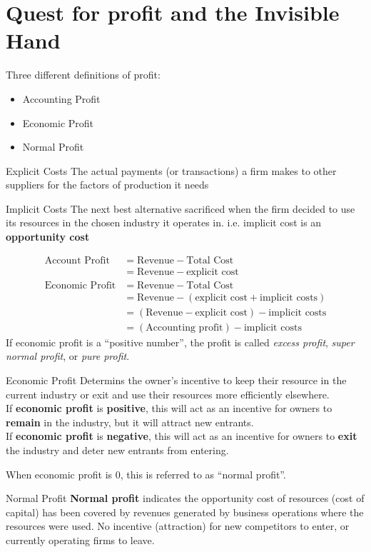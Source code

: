 \section{Quest for profit and the Invisible Hand}
Three different definitions of profit:
\begin{itemize}
	\item Accounting Profit
	\item Economic Profit
	\item Normal Profit
\end{itemize}
\begin{note}{Explicit Costs}
	The actual payments (or transactions) a firm makes to other suppliers for the factors of production it needs
\end{note}
\begin{note}{Implicit Costs}
	The next best alternative sacrificed when the firm decided to use its resources in the chosen industry it operates in. i.e. implicit cost is an \textbf{opportunity cost}
\end{note}
\begin{align*}
	\text{Account Profit} &= \text{Revenue} - \text{Total Cost}\\
	&= \text{Revenue} - \text{explicit cost}\\
	\text{Economic Profit} &= \text{Revenue} - \text{Total Cost}\\
	&= \text{Revenue} - (\text{explicit cost} + \text{implicit costs})\\
	&= (\text{Revenue} - \text{explicit cost}) - \text{implicit costs}\\
	&= (\text{Accounting profit}) - \text{implicit costs}
\end{align*}
If economic profit is a ``positive number'', the profit is called \textit{excess profit}, \textit{super normal profit}, or \textit{pure profit}.
\begin{note}{Economic Profit}
	Determins the owner's incentive to keep their resource in the current industry or exit and use their resources more efficiently elsewhere.\\
	If \textbf{economic profit} is \textbf{positive}, this will act as an incentive for owners to \textbf{remain} in the industry, but it will attract new entrants.\\
	If \textbf{economic profit} is \textbf{negative}, this will act as an incentive for owners to \textbf{exit} the industry and deter new entrants from entering.
\end{note}
When economic profit is 0, this is referred to as ``normal profit''.
\begin{note}{Normal Profit}
	\textbf{Normal profit} indicates the opportunity cost of resources (cost of capital) has been covered by revenues generated by business operations where the resources were used. No incentive (attraction) for new competitors to enter, or currently operating firms to leave.
\end{note}

